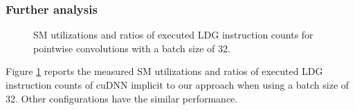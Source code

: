 \subsubsection{Further analysis}
\begin{figure}
    \centering
    \qquad
    \vspace{5mm}
    \vspace{-4mm}
    \caption{SM utilizations and ratios of executed LDG instruction counts for pointwise convolutions with a batch size of 32.}
    \label{fig:pwinfo}
\end{figure}
Figure \ref{fig:pwinfo} reports the measured SM utilizations and ratios of executed LDG instruction counts of cuDNN implicit to our approach when using a batch size of 32. Other configurations have the similar performance. 

